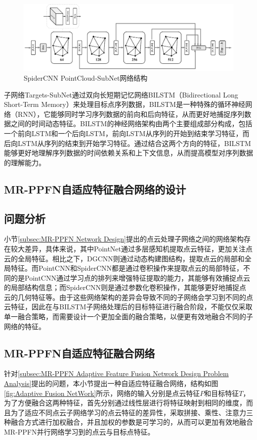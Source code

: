 \begin{figure}[htbp]
    \centering
    \includegraphics[width=1\linewidth]{imgs/spidercnn subnet.pdf}
    \caption{SpiderCNN PointCloud-SubNet网络结构}
    \label{fig:SpiderCNN subnet}
\end{figure}

子网络Targets-SubNet通过双向长短期记忆网络BILSTM（Bidirectional Long Short-Term Memory）来处理目标点序列数据，BILSTM是一种特殊的循环神经网络（RNN），它能够同时学习序列数据的前向和后向特征，从而更好地捕捉序列数据之间的时间动态特征。BILSTM的神经网络架构由两个主要组成部分构成，包括一个前向LSTM和一个后向LSTM，前向LSTM从序列的开始到结束学习特征，而后向LSTM从序列的结束到开始学习特征。通过结合这两个方向的特征，BILSTM能够更好地理解序列数据的时间依赖关系和上下文信息，从而提高模型对序列数据的理解能力。


\subsection{MR-PPFN自适应特征融合网络的设计}
\label{subsec:MR-PPFN Adaptive Feature Fusion Network Design}
\subsection{问题分析}
\label{subsec:MR-PPFN Adaptive Feature Fusion Network Design Problem Analysis}
小节\eqref{subsec:MR-PPFN Network Design}提出的点云处理子网络之间的网络架构存在较大差异，具体来说，其中PointNet通过多层感知机提取点云特征，更加关注点云的全局特征。相比之下，DGCNN则通过动态构建图结构，提取点云的局部和全局特征。而PointCNN和SpiderCNN都是通过卷积操作来提取点云的局部特征，不同的是PointCNN通过学习点的排列来增强特征提取的能力，其能够有效捕捉点云的局部结构信息；而SpiderCNN则是通过参数化卷积操作，其能够更好地捕捉点云的几何特征等。由于这些网络架构的差异会导致不同的子网络会学习到不同的点云特征，因此在与BILSTM子网络处理后的目标特征进行融合阶段，不能仅仅采取单一融合策略，而需要设计一个更加全面的融合策略，以便更有效地融合不同的子网络的特征。
\subsection{MR-PPFN自适应特征融合网络}
针对\eqref{subsec:MR-PPFN Adaptive Feature Fusion Network Design Problem Analysis}提出的问题，本小节提出一种自适应特征融合网络，结构如图\eqref{fig:Adaptive Fusion NetWork}所示，网络的输入分别是点云特征$P$和目标特征$T$，为了方便融合这两种特征，首先分别通过线性层进行将特征映射到相同的维度，而且为了适应不同点云子网络学习的点云特征的差异性，采取拼接、乘性、注意力三种融合方式进行加权融合，并且加权的参数是可学习的，从而可以更加有效地融合MR-PPFN并行网络学习到的点云与目标点特征。 

